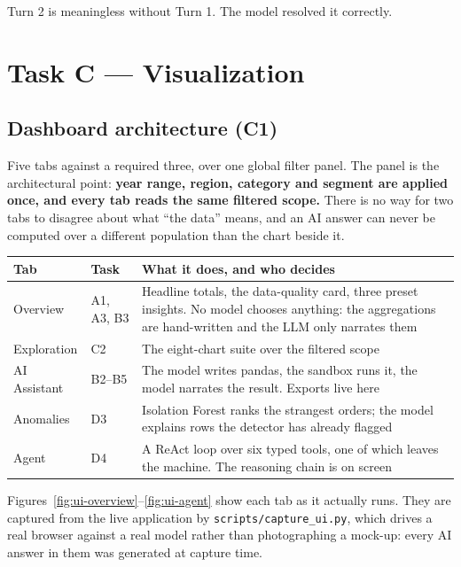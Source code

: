 \documentclass[11pt,a4paper]{article}
\begin{document}
Turn 2 is meaningless without Turn 1. The model resolved it correctly.

\section{Task C --- Visualization}

\subsection{Dashboard architecture (C1)}
\label{sec:tabs}

Five tabs against a required three, over one global filter panel. The panel is the
architectural point: \textbf{year range, region, category and segment are applied
once, and every tab reads the same filtered scope.} There is no way for two tabs to
disagree about what ``the data'' means, and an AI answer can never be computed over a
different population than the chart beside it.

\begin{center}
\begin{tabularx}{\textwidth}{@{}llX@{}}
\toprule
\textbf{Tab} & \textbf{Task} & \textbf{What it does, and who decides} \\
\midrule
Overview     & A1, A3, B3 & Headline totals, the data-quality card, three preset insights. No model chooses anything: the aggregations are hand-written and the LLM only narrates them \\
Exploration  & C2         & The eight-chart suite over the filtered scope \\
AI Assistant & B2--B5     & The model writes pandas, the sandbox runs it, the model narrates the result. Exports live here \\
Anomalies    & D3         & Isolation Forest ranks the strangest orders; the model explains rows the detector has already flagged \\
Agent        & D4         & A ReAct loop over six typed tools, one of which leaves the machine. The reasoning chain is on screen \\
\bottomrule
\end{tabularx}
\end{center}

Figures~\ref{fig:ui-overview}--\ref{fig:ui-agent} show each tab as it actually runs.
They are captured from the live application by \texttt{scripts/capture\_ui.py},
which drives a real browser against a real model rather than photographing a
mock-up: every AI answer in them was generated at capture time.
\end{document}
